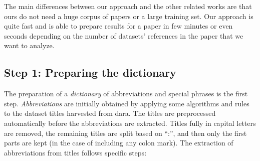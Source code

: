 \documentclass{IOS-Book-Article}
\newcommand{\dara}{\textsf{da\textbar ra}}
\begin{document}
The main differences between our approach and the other related works are that ours do not need a huge corpus of papers or a large training set. Our approach is quite fast and is able to prepare results for a paper in few minutes or even seconds depending on the number of datasets' references in the paper that we want to analyze.

\subsection{Step 1: Preparing the dictionary}
\label{sec:preparing-dictionary}
The preparation of a \emph{dictionary} of abbreviations and special phrases is the first step. \emph{Abbreviations} are initially obtained by applying some algorithms and rules to the dataset titles harvested from {\dara}.
The titles are preprocessed automatically before the abbreviations are extracted. Titles fully in capital letters are removed, the remaining titles are split based on \enquote{:}, and then only the first parts are kept (in the case of including any colon mark).
The extraction of abbreviations from titles follows specific steps:
\end{document}
